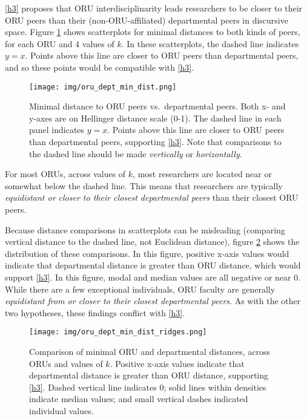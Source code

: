 \documentclass[
  11pt,
]{article}
\begin{document}
\ref{h3} proposes that ORU interdisciplinarity leads researchers to be closer to their ORU peers than their (non-ORU-affiliated) departmental peers in discursive space. Figure \ref{fig.silhouette} shows scatterplots for minimal distances to both kinds of peers, for each ORU and 4 values of \(k\). In these scatterplots, the dashed line indicates \(y=x\). Points above this line are closer to ORU peers than departmental peers, and so these points would be compatible with \ref{h3}.

\begin{figure}
\centering
\texttt{[image: img/oru\_dept\_min\_dist.png]}
\caption{Minimal distance to ORU peers vs.~departmental peers. Both x- and y-axes are on Hellinger distance scale (0-1). The dashed line in each panel indicates \(y=x\). Points above this line are closer to ORU peers than departmental peers, supporting \ref{h3}. Note that comparisons to the dashed line should be made \emph{vertically} or \emph{horizontally}. \label{fig.silhouette}}
\end{figure}

For most ORUs, across values of \(k\), most researchers are located near or somewhat below the dashed line. This means that researchers are typically \emph{equidistant or closer to their closest departmental peers} than their closest ORU peers.

Because distance comparisons in scatterplots can be misleading (comparing vertical distance to the dashed line, not Euclidean distance), figure \ref{fig.ridges} shows the distribution of these comparisons. In this figure, positive x-axis values would indicate that departmental distance is greater than ORU distance, which would support \ref{h3}. In this figure, modal and median values are all negative or near 0. While there are a few exceptional individuals, ORU faculty are generally \emph{equidistant from or closer to their closest departmental peers}. As with the other two hypotheses, these findings conflict with \ref{h3}.

\begin{figure}
\centering
\texttt{[image: img/oru\_dept\_min\_dist\_ridges.png]}
\caption{Comparison of minimal ORU and departmental distances, across ORUs and values of \(k\). Positive x-axis values indicate that departmental distance is greater than ORU distance, supporting \ref{h3}. Dashed vertical line indicates 0; solid lines within densities indicate median values; and small vertical dashes indicated individual values.\label{fig.ridges}}
\end{figure}
\end{document}
